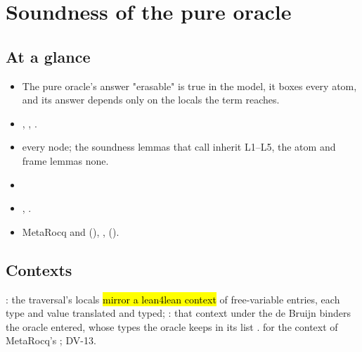 \chapter{Soundness of the pure oracle}\label{chap:oracle}

\section*{At a glance}
\begin{itemize}
\item {} The pure oracle's answer "erasable" is true in the model, it boxes every atom,
  and its answer depends only on the locals the term reaches.
\item {} , ,
  .
\item {} \stProved{} every node; the soundness lemmas that call 
  inherit L1--L5, the atom and frame lemmas none.
\item {} 
\item {} ,
  .
\item {} MetaRocq  and 
  (), , 
  ().
\end{itemize}

\section{Contexts}\label{sec:oracle-ctx}

\begin{definition}
  \label{def:EraseProof-LocalsOK}
  \leanok
   : the traversal's locals \hl{mirror a lean4lean
  context} of free-variable entries, each type and  value translated and typed;
  : that context under the de Bruijn binders the oracle entered, whose types the
  oracle keeps in its list .
    for the context of MetaRocq's ; DV-13.
\end{definition}

